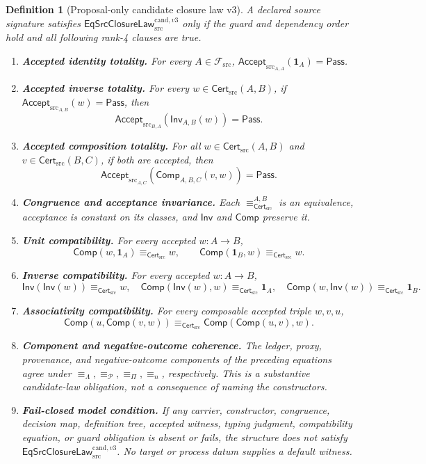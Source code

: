 \documentclass[11pt]{article}
\newtheorem{definition}{Definition}
\newcommand{\Cert}{\mathsf{Cert}_{\mathrm{src}}}
\newcommand{\Accept}{\mathsf{Accept}_{\mathrm{src}}}
\newcommand{\Law}{\mathsf{EqSrcClosureLaw}^{\mathrm{cand},v3}_{\mathrm{src}}}
\newcommand{\Pass}{\mathsf{Pass}}
\begin{document}
\begin{definition}[Proposal-only candidate closure law v3]
A declared source signature satisfies \(\Law\) only if the guard and dependency
order hold and all following rank-4 clauses are true.
\begin{enumerate}[leftmargin=*]
  \item \textbf{Accepted identity totality.}
  For every \(A\in\mathcal F_{\mathrm{src}}\),
  \(\Accept_{A,A}(\mathbf 1_A)=\Pass\).

  \item \textbf{Accepted inverse totality.}
  For every \(w\in\Cert(A,B)\), if \(\Accept_{A,B}(w)=\Pass\), then
  \[
    \Accept_{B,A}(\mathsf{Inv}_{A,B}(w))=\Pass.
  \]

  \item \textbf{Accepted composition totality.}
  For all \(w\in\Cert(A,B)\) and \(v\in\Cert(B,C)\), if both are accepted,
  then
  \[
    \Accept_{A,C}(\mathsf{Comp}_{A,B,C}(v,w))=\Pass.
  \]

  \item \textbf{Congruence and acceptance invariance.}
  Each \(\equiv_{\Cert}^{A,B}\) is an equivalence, acceptance is constant on
  its classes, and \(\mathsf{Inv}\) and \(\mathsf{Comp}\) preserve it.

  \item \textbf{Unit compatibility.}
  For every accepted \(w:A\to B\),
  \[
   \mathsf{Comp}(w,\mathbf 1_A)\equiv_{\Cert}w,\qquad
   \mathsf{Comp}(\mathbf 1_B,w)\equiv_{\Cert}w.
  \]

  \item \textbf{Inverse compatibility.}
  For every accepted \(w:A\to B\),
  \[
  \mathsf{Inv}(\mathsf{Inv}(w))\equiv_{\Cert}w,\quad
  \mathsf{Comp}(\mathsf{Inv}(w),w)\equiv_{\Cert}\mathbf 1_A,\quad
  \mathsf{Comp}(w,\mathsf{Inv}(w))\equiv_{\Cert}\mathbf 1_B.
  \]

  \item \textbf{Associativity compatibility.}
  For every composable accepted triple \(w,v,u\),
  \[
  \mathsf{Comp}(u,\mathsf{Comp}(v,w))
  \equiv_{\Cert}
  \mathsf{Comp}(\mathsf{Comp}(u,v),w).
  \]

  \item \textbf{Component and negative-outcome coherence.}
  The ledger, proxy, provenance, and negative-outcome components of the
  preceding equations agree under
  \(\equiv_\Lambda,\equiv_{\mathcal P},\equiv_\Pi,\equiv_n\), respectively.
  This is a substantive candidate-law obligation, not a consequence of naming
  the constructors.

  \item \textbf{Fail-closed model condition.}
  If any carrier, constructor, congruence, decision map, definition tree,
  accepted witness, typing judgment, compatibility equation, or guard
  obligation is absent or fails, the structure does not satisfy \(\Law\).
  No target or process datum supplies a default witness.
\end{enumerate}
\end{definition}
\end{document}
